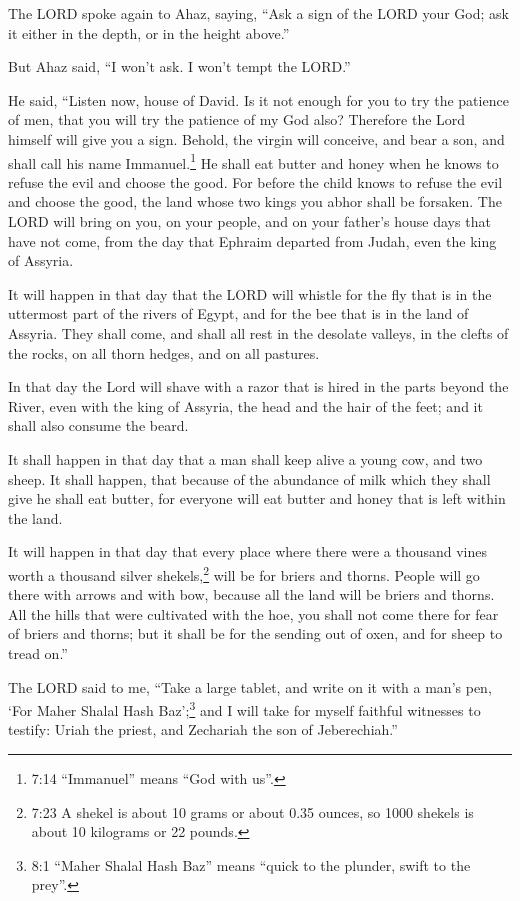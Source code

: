 \myverse{}The LORD spoke again to Ahaz, saying,
\myverse{}“Ask a sign of the LORD your God; ask it either in the depth, or in the height
above.”

\myverse{}But Ahaz said, “I won’t ask. I won’t tempt the LORD.”

\myverse{}He said, “Listen now, house of David. Is it not enough for you
to try the patience of men, that you will try the patience of my God also?
\myverse{}Therefore the Lord himself will give you a sign. Behold, the virgin will conceive,
and bear a son, and shall call his name Immanuel.\footnote{7:14 “Immanuel” means “God with us”.}
\myverse{}He shall eat butter and honey when he knows to refuse the evil and choose
the good.
\myverse{}For before the child knows to refuse the evil and choose the good, the land
whose two kings you abhor shall be forsaken.
\myverse{}The LORD will bring on you, on your people, and on your father’s house days
that have not come, from the day that Ephraim departed from Judah, even the king of Assyria.

\myverse{}It will happen in that day that the LORD will whistle for the
fly that is in the uttermost part of the rivers of Egypt, and for the bee that is in the land of Assyria.
\myverse{}They shall come, and shall all rest in the desolate valleys, in the clefts
of the rocks, on all thorn hedges, and on all pastures.

\myverse{}In that day the Lord will shave with a razor that is hired in
the parts beyond the River, even with the king of Assyria, the head and the hair of the feet; and it shall
also consume the beard.

\myverse{}It shall happen in that day that a man shall keep alive a young
cow, and two sheep.
\myverse{}It shall happen, that because of the abundance of milk which they shall give
he shall eat butter, for everyone will eat butter and honey that is left within the land.

\myverse{}It will happen in that day that every place where there were
a thousand vines worth a thousand silver shekels,\footnote{7:23 A shekel is about 10 grams or about 0.35 ounces, so 1000 shekels is about 10 kilograms or 22
	pounds.} will be for briers and thorns.
\myverse{}People will go there with arrows and with bow, because all the land will be
briers and thorns.
\myverse{}All the hills that were cultivated with the hoe, you shall not come there
for fear of briers and thorns; but it shall be for the sending out of oxen, and for sheep to tread on.”


\mychapter{} \myverse*{}The LORD said to me, “Take a large tablet, and write on it with
a man’s pen, ‘For Maher Shalal Hash Baz’;\footnote{8:1 “Maher Shalal Hash Baz” means “quick to the plunder, swift to the prey”.}
\myverse{}and I will take for myself faithful witnesses to testify: Uriah the priest,
and Zechariah the son of Jeberechiah.”


